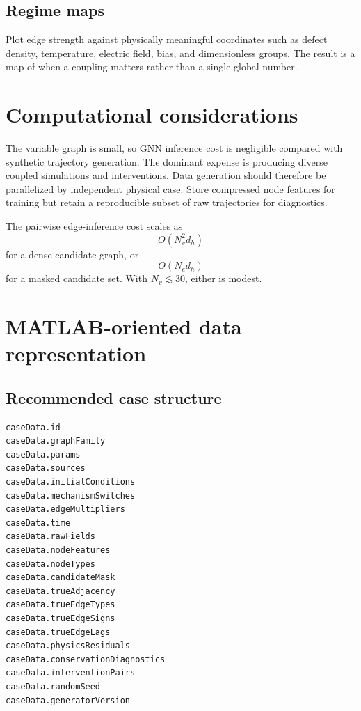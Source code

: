 \documentclass[11pt]{article}
\begin{document}
\subsection{Regime maps}

Plot edge strength against physically meaningful coordinates such as defect density, temperature, electric field, bias, and dimensionless groups. The result is a map of when a coupling matters rather than a single global number.

\section{Computational considerations}

The variable graph is small, so GNN inference cost is negligible compared with synthetic trajectory generation. The dominant expense is producing diverse coupled simulations and interventions. Data generation should therefore be parallelized by independent physical case. Store compressed node features for training but retain a reproducible subset of raw trajectories for diagnostics.

The pairwise edge-inference cost scales as
\begin{equation}
O(N_v^2d_h)
\end{equation}
for a dense candidate graph, or
\begin{equation}
O(N_ed_h)
\end{equation}
for a masked candidate set. With \(N_v\lesssim30\), either is modest.

\section{MATLAB-oriented data representation}

\subsection{Recommended case structure}

\begin{lstlisting}[basicstyle=\ttfamily\small,frame=single,breaklines=true]
caseData.id
caseData.graphFamily
caseData.params
caseData.sources
caseData.initialConditions
caseData.mechanismSwitches
caseData.edgeMultipliers
caseData.time
caseData.rawFields
caseData.nodeFeatures
caseData.nodeTypes
caseData.candidateMask
caseData.trueAdjacency
caseData.trueEdgeTypes
caseData.trueEdgeSigns
caseData.trueEdgeLags
caseData.physicsResiduals
caseData.conservationDiagnostics
caseData.interventionPairs
caseData.randomSeed
caseData.generatorVersion
\end{lstlisting}
\end{document}
